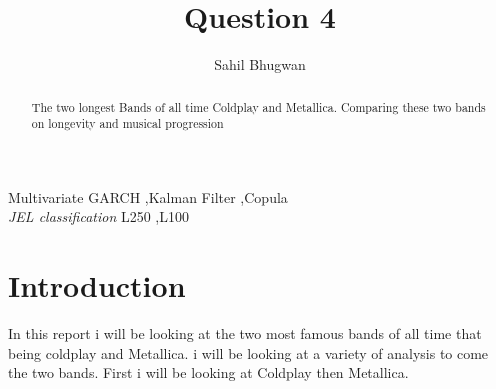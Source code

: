 \documentclass[12pt,preprint, authoryear]{elsarticle}
\numberwithin{equation}{section}
\numberwithin{figure}{section}
\numberwithin{table}{section}
\begin{document}
\begin{frontmatter}  %

\title{Question 4}





\author[Add1]{Sahil Bhugwan}





\address[Add1]{Github- \url{https://github.com/SBhugwan}}


\begin{abstract}
\small{
The two longest Bands of all time Coldplay and Metallica. Comparing
these two bands on longevity and musical progression
}
\end{abstract}

\vspace{1cm}


\begin{keyword}
\footnotesize{
Multivariate GARCH \sep Kalman Filter \sep Copula \\
\vspace{0.3cm}
}
\footnotesize{
\textit{JEL classification} L250 \sep L100
}
\end{keyword}



\vspace{0.5cm}

\end{frontmatter}



\pagestyle{fancy}
\chead{}
\rhead{}
\lfoot{}
\lhead{}
\cfoot{}


\headsep 35pt %




\hypertarget{introduction}{%
\section{\texorpdfstring{Introduction
\label{Introduction}}{Introduction }}\label{introduction}}

In this report i will be looking at the two most famous bands of all
time that being coldplay and Metallica. i will be looking at a variety
of analysis to come the two bands. First i will be looking at Coldplay
then Metallica.
\end{document}
